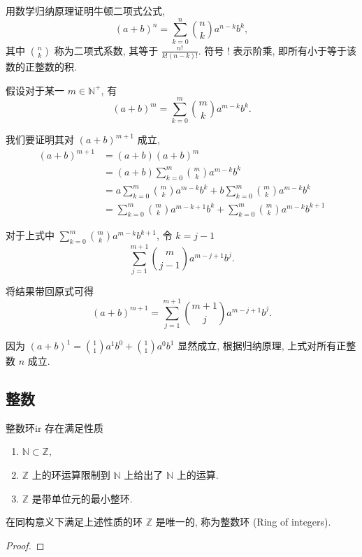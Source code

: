 \documentclass[cn,toc=twocol]{elegantbook}
\newcommand{\ITEMS}{\begin{enumerate}}
\newcommand{\ITEME}{\end{enumerate}}
\newcommand{\N}{\mathbb{N}}
\newcommand{\Z}{\mathbb{Z}}
\begin{document}
\begin{example}
	用数学归纳原理证明牛顿二项式公式,
	\[
		(a + b)^{n} = \sum_{k = 0}^{n} {n \choose k} a^{n - k} b^{k},
	\]
	其中 ${n \choose k}$ 称为二项式系数, 其等于 $\frac {n!}{k!(n-k)!}$. 符号 $!$ 表示阶乘, 即所有小于等于该数的正整数的积.
\end{example}
\begin{solution}
	假设对于某一 $m \in \N^+$, 有
	\[
		(a + b)^{m} = \sum_{k = 0}^{m} {m \choose k} a^{m - k} b^{k}.
	\]
	
	我们要证明其对 $(a + b)^{m+1}$ 成立,
	\[
	\begin{aligned}
		(a + b)^{m+1} & = (a + b)(a + b)^{m}\\
		& = (a + b)\sum_{k = 0}^{m} {m \choose k} a^{m - k} b^{k}\\
		& = a\sum_{k = 0}^{m} {m \choose k} a^{m - k} b^{k} + b\sum_{k = 0}^{m} {m \choose k} a^{m - k} b^{k}\\
		& = \sum_{k = 0}^{m} {m \choose k} a^{m - k + 1} b^{k} + \sum_{k = 0}^{m} {m \choose k} a^{m - k} b^{k + 1} 
	\end{aligned}
	\]
	
	对于上式中 $\sum_{k = 0}^{m} {m \choose k} a^{m - k} b^{k + 1}$, 令 $k = j - 1$
	\[
		\sum_{j = 1}^{m+1} {m \choose j-1} a^{m - j + 1} b^{j}.
	\]
	
	将结果带回原式可得
	\[
		(a + b)^{m+1} = \sum_{j = 1}^{m+1} {m + 1 \choose j} a^{m - j + 1} b^{j}.
	\]
	
	因为 $(a+b)^1 = {1 \choose 1}a^1 b^0 + {1 \choose 1}a^0 b^1$ 显然成立, 根据归纳原理, 上式对所有正整数 $n$ 成立.
\end{solution}


\subsection{整数}

\begin{theorem}{整数环}{ir}
存在满足性质
\ITEMS
	\item $\N \subset \Z,$
	\item $\Z$ 上的环运算限制到 $\N$ 上给出了 $\N$ 上的运算.
	\item $\Z$ 是带单位元的最小整环.
\ITEME
在同构意义下满足上述性质的环 $\Z$ 是唯一的, 称为整数环 (Ring of integers).
	
\end{theorem}

\begin{proof}
\end{proof}
\end{document}
